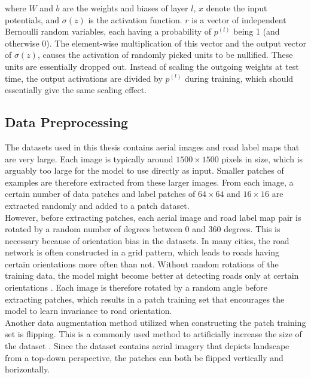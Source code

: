\noindent where $W$ and $b$ are the weights and biases of layer $l$, $x$ denote  the input potentials, and $\sigma(z)$ is the activation function. $r$ is a vector of independent Bernoulli random variables, each having a probability of $p^{(l)}$ being 1 (and otherwise 0). The element-wise multiplication of this vector and the output vector of $\sigma(z)$, causes the activation of randomly picked units to be nullified. These units are essentially dropped out. Instead of scaling the outgoing weights at test time, the output activations are divided by $p^{(l)}$  during training, which should essentially give the same scaling effect.\\


\subsection{Data Preprocessing}
The datasets used in this thesis contains aerial images and road label maps that are very large. Each image is typically around $1500 \times 1500$ pixels in size, which is arguably too large for the model to use directly as input. Smaller patches of examples are therefore extracted from these larger images. From each image, a certain number of data patches and label patches of $64 \times 64$ and $16 \times 16$ are extracted randomly and added to a patch dataset.\\

However, before extracting patches, each aerial image and road label map pair is rotated by a random number of degrees between 0 and 360 degrees. This is necessary because of orientation bias in the datasets. In many cities, the road network is often constructed in a grid pattern, which leads to roads having certain orientations more often than not. Without random rotations of the training data, the model might become better at detecting roads only at certain orientations \citep{Mnih_roads_high_res_aerial_images}. Each image is therefore rotated by a random angle before extracting patches, which results in a patch training set that encourages the model to learn invariance to road orientation.\\

Another data augmentation method utilized when constructing the patch training set is flipping. This is a commonly used method to artificially increase the size of the dataset \citep{Krizhevsky_imagenet}. Since the dataset contains aerial imagery that depicts landscape from a top-down perspective, the patches can both be flipped vertically and horizontally.\\

